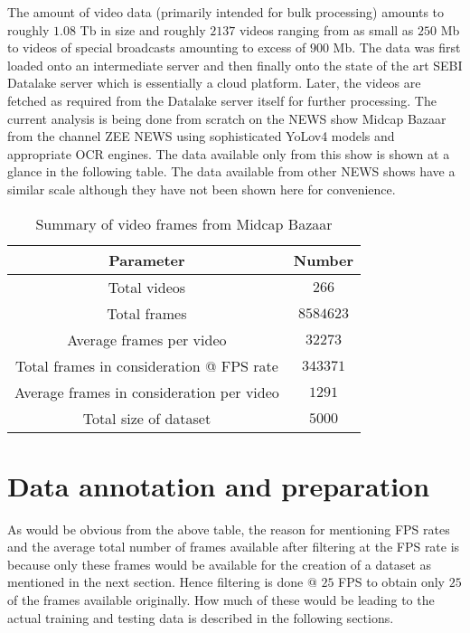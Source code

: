 The amount of video data (primarily intended for bulk processing) amounts to roughly $1.08$ Tb in size and roughly $2137$ videos ranging from as small as $250$ Mb to videos of special broadcasts amounting to excess of $900$ Mb. The data was first loaded onto an intermediate server and then finally onto the state of the art SEBI Datalake server which is essentially a cloud platform. Later, the videos are fetched as required from the Datalake server itself for further processing. The current analysis is being done from scratch on the NEWS show Midcap Bazaar from the channel ZEE NEWS using sophisticated YoLov4 models and appropriate OCR engines. The data available only from this show is shown at a glance in the following table. The data available from other NEWS shows have a similar scale although they have not been shown here for convenience.

\begin{table}[h]
 \def\arraystretch{1.5}
 \centering
 \caption{Summary of video frames from Midcap Bazaar}
 \begin{tabular}{|c|c|}
  \hline
  Parameter & Number\\
  \hline
  Total videos & $266$                   \\
  \hline
  Total frames & $8584623$                   \\
  \hline
  Average frames per video & $32273$                   \\
  \hline
  Total frames in consideration @ FPS rate & $343371$                   \\
  \hline
  Average frames in consideration per video & $1291$                   \\
  \hline
  Total size of dataset & $5000$                   \\
  \hline
 \end{tabular}
 \label{tab:vid_data_tab}
\end{table}

\section{Data annotation and preparation}

As would be obvious from the above table, the reason for mentioning FPS rates and the average total number of frames available after filtering at the FPS rate is because only these frames would be available for the creation of a dataset as mentioned in the next section. Hence filtering is done @ $25$ FPS to obtain only $25$ of the frames available originally. How much of these would be leading to the actual training and testing data is described in the following sections. \par

